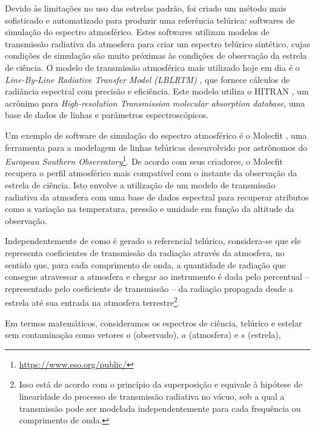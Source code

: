 Devido às limitações no uso das estrelas padrão, foi criado um método mais sofisticado e automatizado para produzir uma referência telúrica: softwares de simulação do espectro atmosférico. Estes softwares utilizam modelos de transmissão radiativa da atmosfera para criar um espectro telúrico sintético, cujas condições de simulação são muito próximas às condições de observação da estrela de ciência. O modelo de transmissão atmosférica mais utilizado hoje em dia é o \textit{Line-By-Line Radiative Transfer Model (LBLRTM)} \citep{2005JQSRT..91..233C}, que fornece cálculos de radiância espectral com precisão e eficiência. Este modelo utiliza o HITRAN \citep{rothman2009hitran}, um acrônimo para \textit{High-resolution Transmission molecular absorption database}, uma base de dados de linhas e parâmetros espectroscópicos. 

Um exemplo de software de simulação do espectro atmosférico é o Molecfit \citep{smette2015molecfit}, uma ferramenta para a modelagem de linhas telúricas desenvolvido por astrônomos do \textit{European Southern Observatory}\footnote{\url{https://www.eso.org/public/}}. De acordo com seus criadores, o Molecfit recupera o perfil atmosférico mais compatível com o instante da observação da estrela de ciência. Isto envolve a utilização de um modelo de transmissão radiativa da atmosfera com uma base de dados espectral para recuperar atributos como a variação na temperatura, pressão e umidade em função da altitude da observação.

Independentemente de como é gerado o referencial telúrico, considera-se que ele representa coeficientes de transmissão da radiação através da atmosfera, no sentido que, para cada comprimento de onda, a quantidade de radiação que consegue atravessar a atmosfera e chegar ao instrumento é dada pelo percentual -- representado pelo coeficiente de transmissão -- da radiação propagada desde a estrela até sua entrada na atmosfera terrestre\footnote{Isso está de acordo com o princípio da superposição e equivale à hipótese de linearidade do processo de transmissão radiativa no vácuo, sob a qual a transmissão pode ser modelada independentemente para cada frequência ou comprimento de onda.}. %

Em termos matemáticos, consideramos os espectros de ciência, telúrico e estelar sem contaminação como vetores $o$ (observado), $a$ (atmosfera) e $s$ (estrela),

